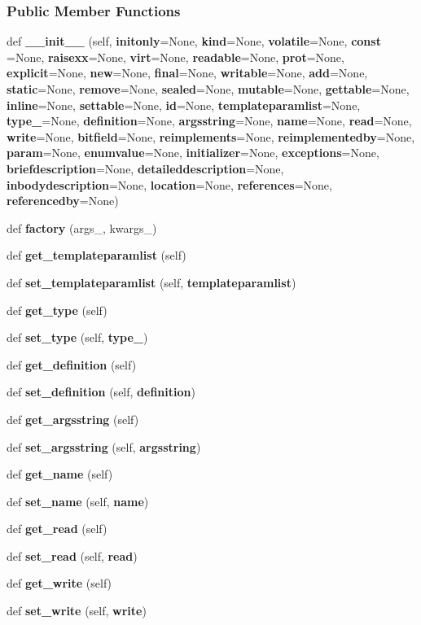 \subsubsection*{Public Member Functions}
\begin{DoxyCompactItemize}
\item 
def {\bf \+\_\+\+\_\+init\+\_\+\+\_\+} (self, {\bf initonly}=None, {\bf kind}=None, {\bf volatile}=None, {\bf const} =None, {\bf raisexx}=None, {\bf virt}=None, {\bf readable}=None, {\bf prot}=None, {\bf explicit}=None, {\bf new}=None, {\bf final}=None, {\bf writable}=None, {\bf add}=None, {\bf static}=None, {\bf remove}=None, {\bf sealed}=None, {\bf mutable}=None, {\bf gettable}=None, {\bf inline}=None, {\bf settable}=None, {\bf id}=None, {\bf templateparamlist}=None, {\bf type\+\_\+}=None, {\bf definition}=None, {\bf argsstring}=None, {\bf name}=None, {\bf read}=None, {\bf write}=None, {\bf bitfield}=None, {\bf reimplements}=None, {\bf reimplementedby}=None, {\bf param}=None, {\bf enumvalue}=None, {\bf initializer}=None, {\bf exceptions}=None, {\bf briefdescription}=None, {\bf detaileddescription}=None, {\bf inbodydescription}=None, {\bf location}=None, {\bf references}=None, {\bf referencedby}=None)
\item 
def {\bf factory} (args\+\_\+, kwargs\+\_\+)
\item 
def {\bf get\+\_\+templateparamlist} (self)
\item 
def {\bf set\+\_\+templateparamlist} (self, {\bf templateparamlist})
\item 
def {\bf get\+\_\+type} (self)
\item 
def {\bf set\+\_\+type} (self, {\bf type\+\_\+})
\item 
def {\bf get\+\_\+definition} (self)
\item 
def {\bf set\+\_\+definition} (self, {\bf definition})
\item 
def {\bf get\+\_\+argsstring} (self)
\item 
def {\bf set\+\_\+argsstring} (self, {\bf argsstring})
\item 
def {\bf get\+\_\+name} (self)
\item 
def {\bf set\+\_\+name} (self, {\bf name})
\item 
def {\bf get\+\_\+read} (self)
\item 
def {\bf set\+\_\+read} (self, {\bf read})
\item 
def {\bf get\+\_\+write} (self)
\item 
def {\bf set\+\_\+write} (self, {\bf write})
\item 

\end{DoxyCompactItemize}
